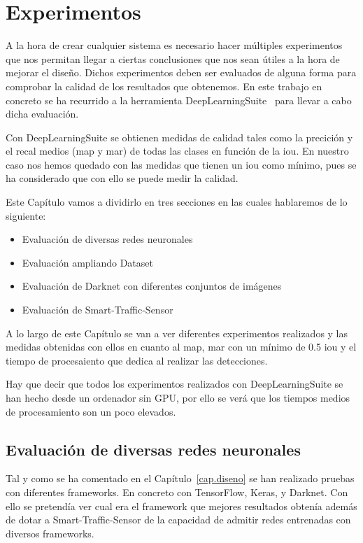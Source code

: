 \chapter{Experimentos}\label{cap.experimentos}

A la hora de crear cualquier sistema es necesario hacer múltiples experimentos que nos permitan llegar a ciertas conclusiones que nos sean útiles a la hora de mejorar el diseño. Dichos experimentos deben ser evaluados de alguna forma para comprobar la calidad de los resultados que obtenemos. En este trabajo en concreto se ha recurrido a la herramienta DeepLearningSuite~\cite{detectionsuite} para llevar a cabo dicha evaluación.

Con DeepLearningSuite se obtienen medidas de calidad tales como la precición y el recal medios (\acrshort{map} y \acrshort{mar}) de todas las clases en función de la \acrfull{iou}. En nuestro caso nos hemos quedado con las medidas que tienen un \acrshort{iou} como mínimo, pues se ha considerado que con ello se puede medir la calidad.

Este Capítulo vamos a dividirlo en tres secciones en las cuales hablaremos de lo siguiente:
\begin{itemize}
    \item Evaluación de diversas redes neuronales
    \item Evaluación ampliando Dataset
    \item Evaluación de Darknet con diferentes conjuntos  de imágenes
    \item Evaluación de Smart-Traffic-Sensor
\end{itemize}

A lo largo de este Capítulo se van a ver diferentes experimentos realizados y las medidas obtenidas con ellos en cuanto al \acrfull{map}, \acrfull{mar} con un mínimo de 0.5 \acrshort{iou} y el tiempo de procesaiento que dedica al realizar las detecciones.

Hay que decir que todos los experimentos realizados con DeepLearningSuite se han hecho desde un ordenador sin GPU, por ello se verá que los tiempos medios de procesamiento son un poco elevados.

\section{Evaluación de diversas redes neuronales}
 
Tal y como se ha comentado en el Capítulo~\ref{cap.diseno} se han realizado pruebas con diferentes frameworks. En concreto con TensorFlow, Keras, y Darknet. Con ello se pretendía ver cual era el framework que mejores resultados obtenía además de dotar a Smart-Traffic-Sensor de la capacidad de admitir redes entrenadas con diversos frameworks.

